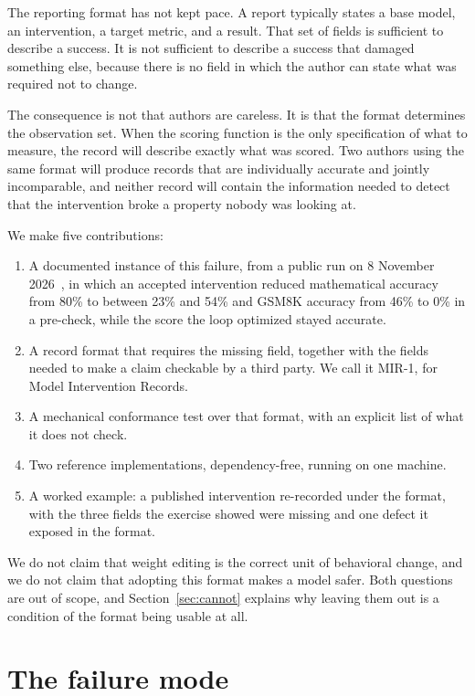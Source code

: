 \documentclass[11pt]{article}
\begin{document}
The reporting format has not kept pace. A report typically states a base model,
an intervention, a target metric, and a result. That set of fields is
sufficient to describe a success. It is not sufficient to describe a success
that damaged something else, because there is no field in which the author can
state what was required not to change.

The consequence is not that authors are careless. It is that the format
determines the observation set. When the scoring function is the only
specification of what to measure, the record will describe exactly what was
scored. Two authors using the same format will produce records that are
individually accurate and jointly incomparable, and neither record will contain
the information needed to detect that the intervention broke a property nobody
was looking at.

We make five contributions:

\begin{enumerate}
\item A documented instance of this failure, from a public run on 8 November
  2026~\cite{beaker}, in which an accepted intervention reduced mathematical
  accuracy from 80\% to between 23\% and 54\% and GSM8K accuracy from 46\% to
  0\% in a pre-check, while the score the loop optimized stayed accurate.
\item A record format that requires the missing field, together with the fields
  needed to make a claim checkable by a third party. We call it MIR-1, for
  Model Intervention Records.
\item A mechanical conformance test over that format, with an explicit list of
  what it does not check.
\item Two reference implementations, dependency-free, running on one machine.
\item A worked example: a published intervention re-recorded under the format,
  with the three fields the exercise showed were missing and one defect it
  exposed in the format.
\end{enumerate}

We do not claim that weight editing is the correct unit of behavioral change,
and we do not claim that adopting this format makes a model safer. Both
questions are out of scope, and Section~\ref{sec:cannot} explains why leaving
them out is a condition of the format being usable at all.

\section{The failure mode}
\end{document}
